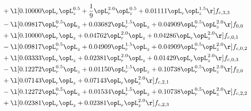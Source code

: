 \begin{alignat}{2}
& + \l[  0.10000 \opL_r \opL_z^{0.5} + \frac{1}{9} \opL_r^{2.0} \opL_z^{0.5} +  0.01111 \opL_r \opL_z^{1.5}  \r] f_{c,3,3} \nonumber \\ 
& - \l[  0.09817 \opL_r^{0.5} \opL_z +  0.03682 \opL_r^{1.5} \opL_z +  0.04909 \opL_r^{0.5} \opL_z^{2.0}  \r] f_{0,0} \nonumber \\ 
& + \l[  0.10000 \opL_r \opL_z +  0.04762 \opL_r^{2.0} \opL_z +  0.04286 \opL_r \opL_z^{2.0}  \r] f_{c,0,1} \nonumber \\ 
& - \l[  0.09817 \opL_r^{0.5} \opL_z +  0.04909 \opL_r^{1.5} \opL_z +  0.04909 \opL_r^{0.5} \opL_z^{2.0}  \r] f_{c,0,2} \nonumber \\ 
& + \l[  0.03333 \opL_r \opL_z +  0.02381 \opL_r^{2.0} \opL_z +  0.01429 \opL_r \opL_z^{2.0}  \r] f_{c,0,3} \nonumber \\ 
& - \l[  0.12272 \opL_r^{0.5} \opL_z +  0.01150 \opL_r^{1.5} \opL_z +  0.10738 \opL_r^{0.5} \opL_z^{2.0}  \r] f_{2,0} \nonumber \\ 
& + \l[  0.07143 \opL_r \opL_z +  0.07143 \opL_r \opL_z^{2.0}  \r] f_{c,2,1} \nonumber \\ 
& - \l[  0.12272 \opL_r^{0.5} \opL_z +  0.01534 \opL_r^{1.5} \opL_z +  0.10738 \opL_r^{0.5} \opL_z^{2.0}  \r] f_{c,2,2} \nonumber \\ 
& + \l[  0.02381 \opL_r \opL_z +  0.02381 \opL_r \opL_z^{2.0}  \r] f_{c,2,3} \nonumber \\ 
\end{alignat} 


